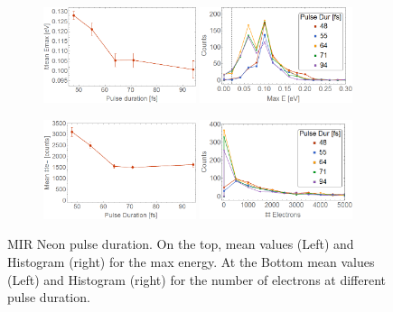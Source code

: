 \begin{figure}[h!]
\captionsetup[subfloat]{farskip=2pt,captionskip=1pt}
\centering
\begin{subfigure}[l]{1\textwidth}
\includegraphics[width=0.49\textwidth]{../Images/results/MIR_Ne_pulseduration/MeanEnerg.png}
\includegraphics[width=0.49\textwidth]{../Images/results/MIR_Ne_pulseduration/HEnerg.png}  				\end{subfigure}
\centering
\begin{subfigure}[l]{1\textwidth}
\includegraphics[width=0.49\textwidth]{../Images/results/MIR_Ne_pulseduration/MeanElec.png}
\includegraphics[width=0.49\textwidth]{../Images/results/MIR_Ne_pulseduration/HElec.png} 				\end{subfigure}
\caption[MIR Neon pulse duration. Mean values and Histograms]{MIR Neon pulse duration. On the top, mean values (Left) and Histogram (right) for the max energy. At the Bottom mean values (Left) and Histogram (right) for the number of electrons at different pulse duration.}
\label{fig:Nehistopulse}
\end{figure}




